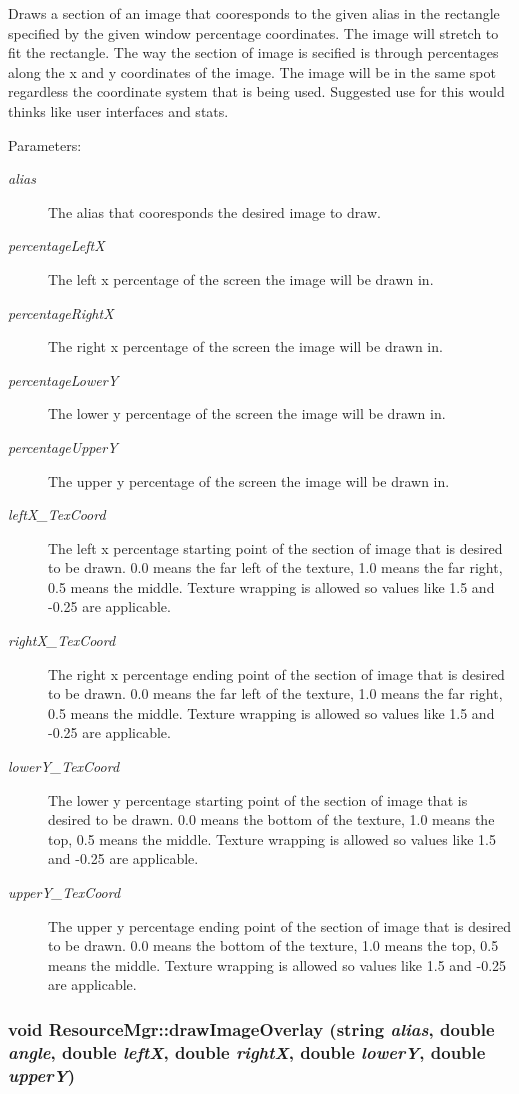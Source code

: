 Draws a section of an image that cooresponds to the given alias in the rectangle specified by the given window percentage coordinates. The image will stretch to fit the rectangle. The way the section of image is secified is through percentages along the x and y coordinates of the image. The image will be in the same spot regardless the coordinate system that is being used. Suggested use for this would thinks like user interfaces and stats. \begin{Desc}
\item[Parameters:]
\begin{description}
\item[{\em alias}]The alias that cooresponds the desired image to draw. \item[{\em percentageLeftX}]The left x percentage of the screen the image will be drawn in. \item[{\em percentageRightX}]The right x percentage of the screen the image will be drawn in. \item[{\em percentageLowerY}]The lower y percentage of the screen the image will be drawn in. \item[{\em percentageUpperY}]The upper y percentage of the screen the image will be drawn in. \item[{\em leftX\_\-TexCoord}]The left x percentage starting point of the section of image that is desired to be drawn. 0.0 means the far left of the texture, 1.0 means the far right, 0.5 means the middle. Texture wrapping is allowed so values like 1.5 and -0.25 are applicable. \item[{\em rightX\_\-TexCoord}]The right x percentage ending point of the section of image that is desired to be drawn. 0.0 means the far left of the texture, 1.0 means the far right, 0.5 means the middle. Texture wrapping is allowed so values like 1.5 and -0.25 are applicable. \item[{\em lowerY\_\-TexCoord}]The lower y percentage starting point of the section of image that is desired to be drawn. 0.0 means the bottom of the texture, 1.0 means the top, 0.5 means the middle. Texture wrapping is allowed so values like 1.5 and -0.25 are applicable. \item[{\em upperY\_\-TexCoord}]The upper y percentage ending point of the section of image that is desired to be drawn. 0.0 means the bottom of the texture, 1.0 means the top, 0.5 means the middle. Texture wrapping is allowed so values like 1.5 and -0.25 are applicable. \end{description}
\end{Desc}
\hypertarget{class_resource_mgr_5294405787589cf25735ba6880e50ab5}{
\subsubsection[{drawImageOverlay}]{\setlength{\rightskip}{0pt plus 5cm}void ResourceMgr::drawImageOverlay (string {\em alias}, \/  double {\em angle}, \/  double {\em leftX}, \/  double {\em rightX}, \/  double {\em lowerY}, \/  double {\em upperY})}}
\label{class_resource_mgr_5294405787589cf25735ba6880e50ab5}


